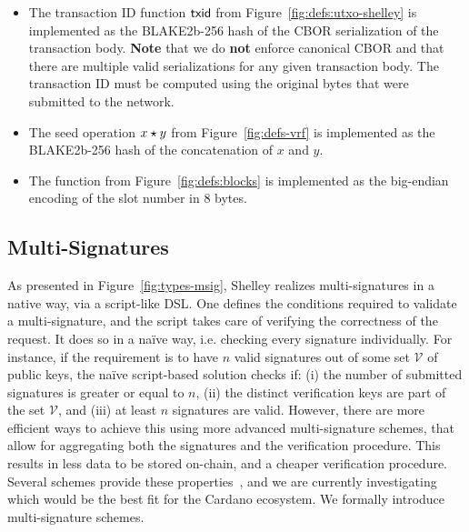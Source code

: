 \begin{itemize}
  \item The transaction ID function $\mathsf{txid}$ from Figure~\ref{fig:defs:utxo-shelley} is implemented
        as the BLAKE2b-256 hash of the CBOR serialization of the transaction body.
        \textbf{Note} that we do \textbf{not} enforce canonical CBOR and that there are
        multiple valid serializations for any given transaction body.
        The transaction ID must be computed using the original bytes that were
        submitted to the network.
  \item The seed operation $x \star y$ from Figure~\ref{fig:defs-vrf} is implemented
        as the BLAKE2b-256 hash of the concatenation of $x$ and $y$.
  \item The function  from Figure~\ref{fig:defs:blocks} is implemented
        as the big-endian encoding of the slot number in 8 bytes.
\end{itemize}


\subsection{Multi-Signatures}
As presented in Figure~\ref{fig:types-msig}, Shelley realizes multi-signatures 
in a native way, via a script-like DSL. One defines the conditions required to 
validate a multi-signature, and the script takes care of verifying the 
correctness of the request. It does so in a na\"ive way, i.e. checking every 
signature individually. For instance, if the requirement is to have $n$ valid 
signatures out of some set $\mathcal{V}$ of public keys, the na\"ive 
script-based solution checks if: (i) the number of submitted signatures is 
greater or equal to $n$, (ii) the distinct verification keys are part of the set 
$\mathcal{V}$, and (iii) at least $n$ signatures are valid. However, there are 
more efficient ways to achieve this using more advanced multi-signature schemes, 
that allow for aggregating both the signatures and the verification procedure. 
This results in less data to be stored on-chain, and a cheaper verification 
procedure. Several schemes provide these properties~\cite{musigBoneh, musig, 
musig2, pixel}, and we are currently investigating which would be the best fit 
for the Cardano ecosystem. We formally introduce multi-signature schemes.

